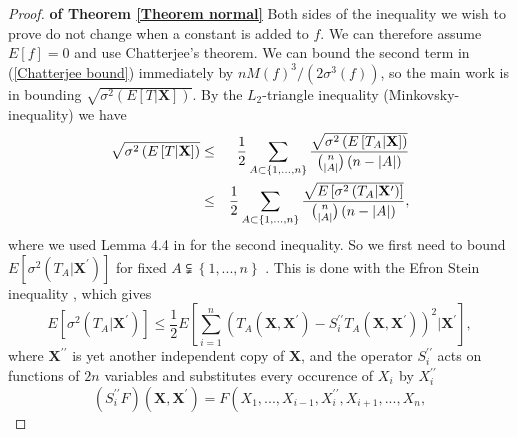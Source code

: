 \documentclass[final,12pt]{colt2018} %
\begin{document}
						\begin{proof}{\bf of Theorem \protect\ref{Theorem normal}}
							Both sides of the inequality we wish to prove do not change when a
							constant is added to $f$. We can therefore assume $E\left[ f\right] =0$ and
							use Chatterjee's theorem. We can bound the second term in (\ref{Chatterjee bound}) immediately by $%
							nM\left( f\right) ^{3}/\left( 2\sigma ^{3}\left( f\right) \right) $, so the
							main work is in bounding $\sqrt{\sigma ^{2}\left( E\left[ T|\mathbf{X}\right]
								\right) }$. By the $L_{2}$-triangle inequality (Minkovsky-inequality) we have%
							\begin{eqnarray*}
								\sqrt{\sigma ^{2}\left( E\left[ T|\mathbf{X}\right] \right) } &\leq &\frac{1%
								}{2}\sum_{A\subset \left\{ 1,...,n\right\} }\frac{\sqrt{\sigma ^{2}\left( E%
									\left[ T_{A}|\mathbf{X}\right] \right) }}{\binom{n}{\left\vert A\right\vert }%
								\left( n-\left\vert A\right\vert \right) } \\
							&\leq &\frac{1}{2}\sum_{A\subset \left\{ 1,...,n\right\} }\frac{\sqrt{E\left[
									\sigma ^{2}\left( T_{A}|\mathbf{X}^{\prime }\right) \right] }}{\binom{n}{%
									\left\vert A\right\vert }\left( n-\left\vert A\right\vert \right) },
						\end{eqnarray*}%
						where we used Lemma 4.4 in \cite{Chatterjee 2008} for the second inequality.
						So we first need to bound $E\left[ \sigma ^{2}\left( T_{A}|\mathbf{X}%
						^{\prime }\right) \right] $ for fixed $A\subsetneqq \left\{ 1,...,n\right\} $%
						. This is done with the Efron Stein inequality \cite{Efron 1981}, which
						gives 
						\begin{equation*}
						E\left[ \sigma ^{2}\left( T_{A}|\mathbf{X}^{\prime }\right) \right] \leq 
						\frac{1}{2}E\left[ \sum_{i=1}^{n}\left( T_{A}\left( \mathbf{X},\mathbf{X}%
						^{\prime }\right) -S_{i}^{\prime \prime }T_{A}\left( \mathbf{X},\mathbf{X}%
						^{\prime }\right) \right) ^{2}|\mathbf{X}^{\prime }\right] , 
						\end{equation*}%
						where $\mathbf{X}^{\prime \prime }$ is yet another independent copy of $%
						\mathbf{X}$, and the operator $S_{i}^{\prime \prime }$ acts on functions of $%
						2n$ variables and substitutes every occurence of $X_{i}\,\ $by $%
						X_{i}^{\prime \prime }$%
						\begin{equation*}
						\left( S_{i}^{\prime \prime }F\right) \left( \mathbf{X},\mathbf{X}^{\prime
						}\right) =F\left( X_{1},...,X_{i-1},X_{i}^{\prime \prime },X_{i+1},...,X_{n},%

\end{equation*}
\end{proof}
\end{document}
